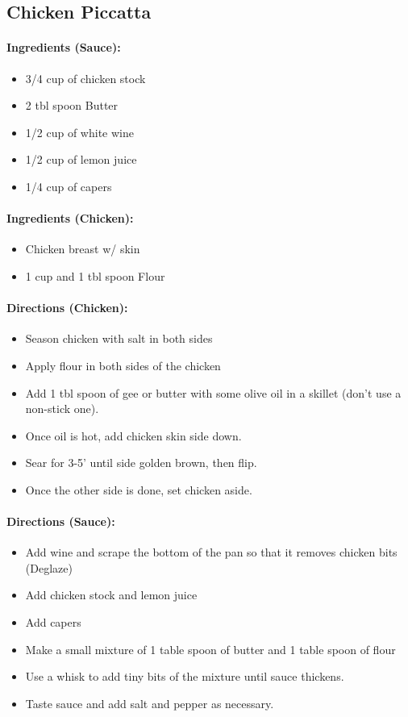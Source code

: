 \documentclass{article}
\begin{document}
\subsection{Chicken Piccatta} 

\paragraph{Ingredients (Sauce):}
\begin{itemize}
    \item 3/4 cup of chicken stock
    \item 2 tbl spoon Butter
    \item 1/2 cup of white wine
    \item 1/2 cup of lemon juice
    \item 1/4 cup of capers
\end{itemize}  

\paragraph{Ingredients (Chicken):}
\begin{itemize}
    \item Chicken breast w/ skin
    \item 1 cup and 1 tbl spoon Flour
\end{itemize}  

\paragraph{Directions (Chicken):}
\begin{itemize}
    \item Season chicken with salt in both sides
    \item Apply flour in both sides of the chicken
    \item Add 1 tbl spoon of gee or butter with some olive oil in a skillet (don't use a non-stick one).
    \item Once oil is hot, add chicken skin side down.
    \item Sear for 3-5' until side golden brown, then flip.
    \item Once the other side is done, set chicken aside.
\end{itemize}  

\paragraph{Directions (Sauce):}
\begin{itemize}
    \item Add wine and scrape the bottom of the pan so that it removes chicken bits (Deglaze)
    \item Add chicken stock and lemon juice
    \item Add capers
    \item Make a small mixture of 1 table spoon of butter and 1 table spoon of flour
    \item Use a whisk to add tiny bits of the mixture until sauce thickens.
    \item Taste sauce and add salt and pepper as necessary.
\end{itemize} 
\end{document}
